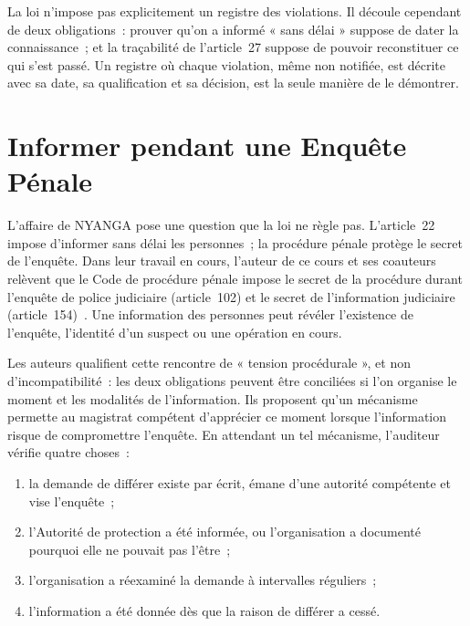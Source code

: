 La loi n'impose pas explicitement un registre des violations. Il découle
cependant de deux obligations~: prouver qu'on a informé « sans délai »
suppose de dater la connaissance~; et la traçabilité de l'article~27
suppose de pouvoir reconstituer ce qui s'est passé. Un registre où chaque
violation, même non notifiée, est décrite avec sa date, sa qualification
et sa décision, est la seule manière de le démontrer.

\section{Informer pendant une Enquête Pénale}
\label{sec:c12-penal}

L'affaire de NYANGA pose une question que la loi ne règle pas. L'article~22
impose d'informer sans délai les personnes~; la procédure pénale protège
le secret de l'enquête. Dans leur travail en cours, l'auteur de ce cours et
ses coauteurs relèvent que le Code de procédure pénale impose le secret de
la procédure durant l'enquête de police judiciaire (article~102) et le
secret de l'information judiciaire (article~154)~\cite{minka2026chainepenale}.
Une information des personnes peut révéler l'existence de l'enquête,
l'identité d'un suspect ou une opération en cours.

Les auteurs qualifient cette rencontre de « tension procédurale », et non
d'incompatibilité~: les deux obligations peuvent être conciliées si l'on
organise le moment et les modalités de l'information. Ils proposent qu'un
mécanisme permette au magistrat compétent d'apprécier ce moment lorsque
l'information risque de compromettre l'enquête. En attendant un tel
mécanisme, l'auditeur vérifie quatre choses~:

\begin{enumerate}
    \item la demande de différer existe par écrit, émane d'une autorité
          compétente et vise l'enquête~;
    \item l'Autorité de protection a été informée, ou l'organisation a
          documenté pourquoi elle ne pouvait pas l'être~;
    \item l'organisation a réexaminé la demande à intervalles réguliers~;
    \item l'information a été donnée dès que la raison de différer a cessé.
\end{enumerate}

